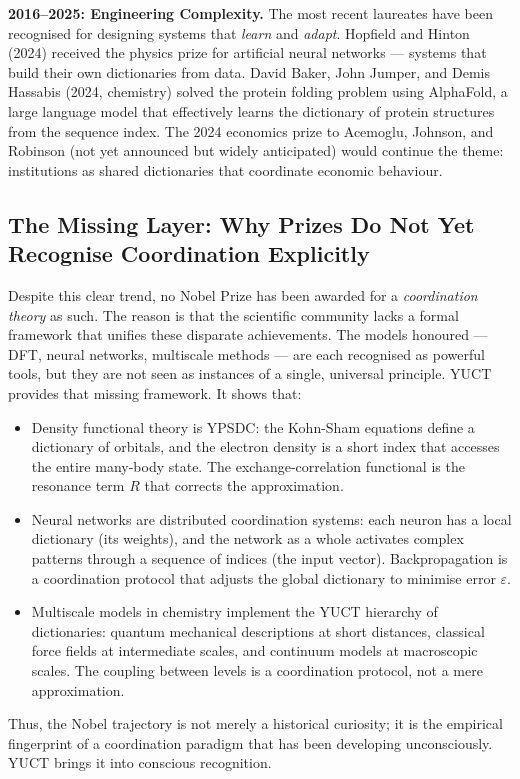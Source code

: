 \documentclass[12pt,a4paper]{article}
\begin{document}
	\textbf{2016–2025: Engineering Complexity.} The most recent laureates have been recognised for designing systems that \emph{learn} and \emph{adapt}. Hopfield and Hinton (2024) received the physics prize for artificial neural networks — systems that build their own dictionaries from data. David Baker, John Jumper, and Demis Hassabis (2024, chemistry) solved the protein folding problem using AlphaFold, a large language model that effectively learns the dictionary of protein structures from the sequence index. The 2024 economics prize to Acemoglu, Johnson, and Robinson (not yet announced but widely anticipated) would continue the theme: institutions as shared dictionaries that coordinate economic behaviour.
	
	\subsection{The Missing Layer: Why Prizes Do Not Yet Recognise Coordination Explicitly}
	
	Despite this clear trend, no Nobel Prize has been awarded for a \emph{coordination theory} as such. The reason is that the scientific community lacks a formal framework that unifies these disparate achievements. The models honoured — DFT, neural networks, multiscale methods — are each recognised as powerful tools, but they are not seen as instances of a single, universal principle. YUCT provides that missing framework. It shows that:
	\begin{itemize}
		\item Density functional theory is YPSDC: the Kohn-Sham equations define a dictionary of orbitals, and the electron density is a short index that accesses the entire many-body state. The exchange-correlation functional is the resonance term \(R\) that corrects the approximation.
		\item Neural networks are distributed coordination systems: each neuron has a local dictionary (its weights), and the network as a whole activates complex patterns through a sequence of indices (the input vector). Backpropagation is a coordination protocol that adjusts the global dictionary to minimise error \(\varepsilon\).
		\item Multiscale models in chemistry implement the YUCT hierarchy of dictionaries: quantum mechanical descriptions at short distances, classical force fields at intermediate scales, and continuum models at macroscopic scales. The coupling between levels is a coordination protocol, not a mere approximation.
	\end{itemize}
	Thus, the Nobel trajectory is not merely a historical curiosity; it is the empirical fingerprint of a coordination paradigm that has been developing unconsciously. YUCT brings it into conscious recognition.
	
\end{document}
